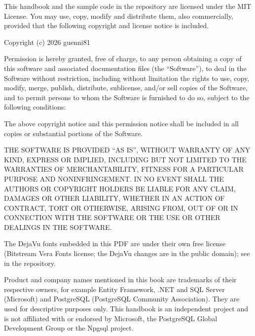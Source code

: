 
This handbook and the sample code in the repository are licensed under the MIT License. You
may use, copy, modify and distribute them, also commercially, provided that the following
copyright and license notice is included.

Copyright (c) 2026 guenni81

Permission is hereby granted, free of charge, to any person obtaining a copy of this
software and associated documentation files (the “Software”), to deal in the Software
without restriction, including without limitation the rights to use, copy, modify, merge,
publish, distribute, sublicense, and/or sell copies of the Software, and to permit persons
to whom the Software is furnished to do so, subject to the following conditions:

The above copyright notice and this permission notice shall be included in all copies or
substantial portions of the Software.

THE SOFTWARE IS PROVIDED “AS IS”, WITHOUT WARRANTY OF ANY KIND, EXPRESS OR IMPLIED,
INCLUDING BUT NOT LIMITED TO THE WARRANTIES OF MERCHANTABILITY, FITNESS FOR A PARTICULAR
PURPOSE AND NONINFRINGEMENT. IN NO EVENT SHALL THE AUTHORS OR COPYRIGHT HOLDERS BE LIABLE
FOR ANY CLAIM, DAMAGES OR OTHER LIABILITY, WHETHER IN AN ACTION OF CONTRACT, TORT OR
OTHERWISE, ARISING FROM, OUT OF OR IN CONNECTION WITH THE SOFTWARE OR THE USE OR OTHER
DEALINGS IN THE SOFTWARE.

The DejaVu fonts embedded in this PDF are under their own free license (Bitstream Vera Fonts
license; the DejaVu changes are in the public domain); see
in the repository.

Product and company names mentioned in this book are trademarks of their respective owners,
for example Entity Framework, .NET and SQL Server (Microsoft) and PostgreSQL (PostgreSQL
Community Association). They are used for descriptive purposes only. This handbook is an
independent project and is not affiliated with or endorsed by Microsoft, the PostgreSQL
Global Development Group or the Npgsql project.
